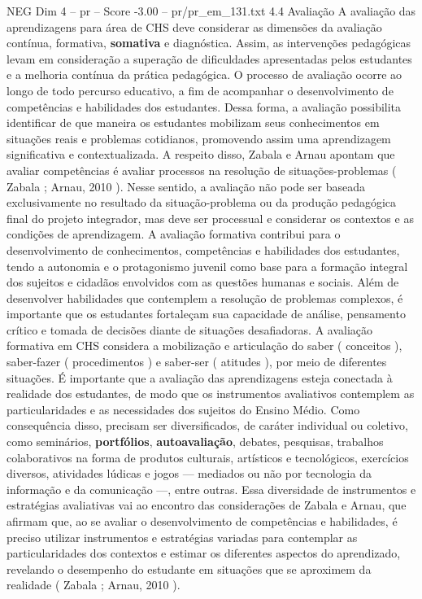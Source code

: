 \begin{textsample}{NEG Dim 4 – pr – Score -3.00 – pr/pr\_em\_131.txt}  \label{ex:f4_neg_104}
4.4 Avaliação A avaliação das aprendizagens para área de CHS deve considerar as dimensões da avaliação contínua, formativa, \textbf{somativa} e diagnóstica.
Assim, as intervenções pedagógicas levam em consideração a superação de dificuldades apresentadas pelos estudantes e a melhoria contínua da prática pedagógica.
O processo de avaliação ocorre ao longo de todo percurso educativo, a fim de acompanhar o desenvolvimento de competências e habilidades dos estudantes.
Dessa forma, a avaliação possibilita identificar de que maneira os estudantes mobilizam seus conhecimentos em situações reais e problemas cotidianos, promovendo assim uma aprendizagem significativa e contextualizada.
A respeito disso, Zabala e Arnau apontam que avaliar competências é avaliar processos na resolução de situações-problemas ( Zabala ; Arnau, 2010 ).
Nesse sentido, a avaliação não pode ser baseada exclusivamente no resultado da situação-problema ou da produção pedagógica final do projeto integrador, mas deve ser processual e considerar os contextos e as condições de aprendizagem.
A avaliação formativa contribui para o desenvolvimento de conhecimentos, competências e habilidades dos estudantes, tendo a autonomia e o protagonismo juvenil como base para a formação integral dos sujeitos e cidadãos envolvidos com as questões humanas e sociais.
Além de desenvolver habilidades que contemplem a resolução de problemas complexos, é importante que os estudantes fortaleçam sua capacidade de análise, pensamento crítico e tomada de decisões diante de situações desafiadoras.
A avaliação formativa em CHS considera a mobilização e articulação do saber ( conceitos ), saber-fazer ( procedimentos ) e saber-ser ( atitudes ), por meio de diferentes situações.
É importante que a avaliação das aprendizagens esteja conectada à realidade dos estudantes, de modo que os instrumentos avaliativos contemplem as particularidades e as necessidades dos sujeitos do Ensino Médio.
Como consequência disso, precisam ser diversificados, de caráter individual ou coletivo, como seminários, \textbf{portfólios}, \textbf{autoavaliação}, debates, pesquisas, trabalhos colaborativos na forma de produtos culturais, artísticos e tecnológicos, exercícios diversos, atividades lúdicas e jogos — mediados ou não por tecnologia da informação e da comunicação —, entre outras.
Essa diversidade de instrumentos e estratégias avaliativas vai ao encontro das considerações de Zabala e Arnau, que afirmam que, ao se avaliar o desenvolvimento de competências e habilidades, é preciso utilizar instrumentos e estratégias variadas para contemplar as particularidades dos contextos e estimar os diferentes aspectos do aprendizado, revelando o desempenho do estudante em situações que se aproximem da realidade ( Zabala ; Arnau, 2010 ).

\end{textsample}
